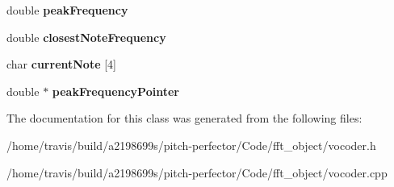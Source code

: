 \begin{DoxyCompactItemize}
\item 
\hypertarget{classVocoder_abae7bb20fa180d030d6a96f08af48429}{double {\bfseries peak\-Frequency}}\label{classVocoder_abae7bb20fa180d030d6a96f08af48429}

\item 
\hypertarget{classVocoder_a6550fbf8de5847c7d5a6fcb90b4f3c2b}{double {\bfseries closest\-Note\-Frequency}}\label{classVocoder_a6550fbf8de5847c7d5a6fcb90b4f3c2b}

\item 
\hypertarget{classVocoder_a41e36ebe0ebd3981e0cd12aedcc62f58}{char {\bfseries current\-Note} \mbox{[}4\mbox{]}}\label{classVocoder_a41e36ebe0ebd3981e0cd12aedcc62f58}

\item 
\hypertarget{classVocoder_a39c8efb28ac192d0956321a29d91d022}{double $\ast$ {\bfseries peak\-Frequency\-Pointer}}\label{classVocoder_a39c8efb28ac192d0956321a29d91d022}

\end{DoxyCompactItemize}


The documentation for this class was generated from the following files\-:\begin{DoxyCompactItemize}
\item 
/home/travis/build/a2198699s/pitch-\/perfector/\-Code/fft\-\_\-object/vocoder.\-h\item 
/home/travis/build/a2198699s/pitch-\/perfector/\-Code/fft\-\_\-object/vocoder.\-cpp\end{DoxyCompactItemize}

